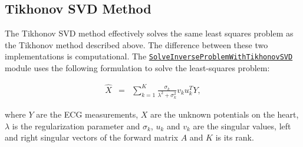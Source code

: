 \subsection{Tikhonov SVD Method}

    The Tikhonov SVD method effectively solves the same least squares problem as the Tikhonov method described above.
    The difference between these two implementations is computational.
    The \href{http://scirundocwiki.sci.utah.edu/SCIRunDocs/index.php5/CIBC:Documentation:SCIRun:Reference:BioPSE:SolveInverseProblemWithTikhonovSVD}{{\tt SolveInverseProblemWithTikhonovSVD}} module uses the following formulation to solve the least-squares problem:
    \begin{center}
    \begin{eqnarray}
        \hat{X}   &=& \sum_{k=1}^K \frac{\sigma_k}{\lambda^2 + \sigma_k^2} v_k u_k^T Y,
    \label{eq:inverseSec_TikhonovSolutions1}
    \end{eqnarray}
    \end{center}
    where $Y$ are the ECG measurements, $X$ are the unknown potentials on the heart, $\lambda$ is the regularization parameter and $\sigma_k$, $u_k$ and $v_k$ are the singular values, left and right singular vectors of the forward matrix $A$ and $K$ is its rank.

